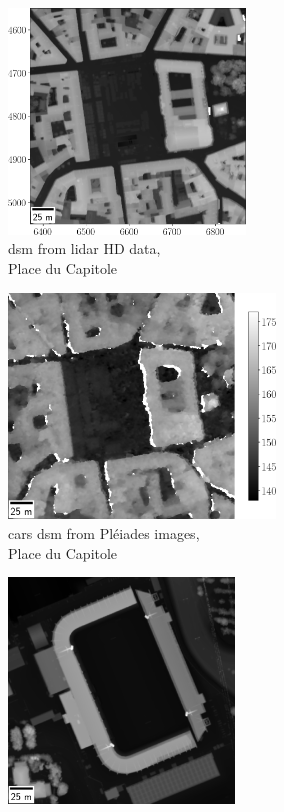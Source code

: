 \begin{figure}
    \centering
    \begin{subfigure}[t]{0.5\linewidth}
        \centering
        \includegraphics[height=6cm]{Images/Chap_1/DSM_Capitole_LiDAR.png}
        \caption{\acrshort{dsm} from \acrshort{lidar} HD data,\\Place du Capitole}
        \label{fig:DSM_capitole_lidar}
    \end{subfigure}\hfill
    \begin{subfigure}[t]{0.5\linewidth}
        \centering
        \includegraphics[height=6cm]{Images/Chap_1/DSM_Capitole_CARS.png}
        \caption{\acrshort{cars} \acrshort{dsm} from Pléiades images,\\Place du Capitole}
        \label{fig:DSM_capitole_cars}
    \end{subfigure}
    \begin{subfigure}[t]{0.5\linewidth}
        \centering
        \includegraphics[height=6cm]{Images/Chap_1/DSM_Wallon_LiDAR.png}

\end{subfigure}
\end{figure}
